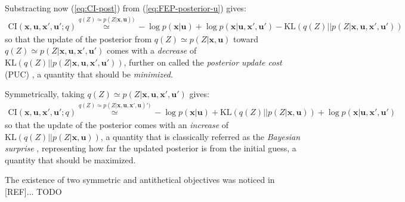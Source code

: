 \documentclass{article}
\begin{document}
{\color{magenta}
Substracting now (\ref{eq:CI-post}) from (\ref{eq:FEP-posterior-u}) gives:
\begin{align}
\text{CI}(\boldsymbol{x},\boldsymbol{u}, \boldsymbol{x}', \boldsymbol{u}';q) \stackrel{q(Z) \simeq p(Z|\boldsymbol{x}, \boldsymbol{u}))}{\simeq}  
-\log p(\boldsymbol{x}| \boldsymbol{u}) 
+ \log p(\boldsymbol{x}| \boldsymbol{u}, \boldsymbol{x}', \boldsymbol{u}') - \text{KL}(q(Z)||p(Z|\boldsymbol{x}, \boldsymbol{u}, \boldsymbol{x}', \boldsymbol{u}'))
\end{align}
so that the update of the posterior from $q(Z)\simeq p(Z|\boldsymbol{x}, \boldsymbol{u})$ toward $q(Z)\simeq p(Z|\boldsymbol{x}, \boldsymbol{u}, \boldsymbol{x}', \boldsymbol{u}')$ comes with a \emph{decrease} of $\text{KL}(q(Z)||p(Z|\boldsymbol{x}, \boldsymbol{u}, \boldsymbol{x}', \boldsymbol{u}'))$, further on called the \emph{posterior update cost} (PUC) , a quantity that should be \emph{minimized}.

Symmetrically, taking $q(Z) \simeq p(Z|\boldsymbol{x}, \boldsymbol{u},\boldsymbol{x}', \boldsymbol{u}')$ gives:
\begin{align}
 \text{CI}(\boldsymbol{x},\boldsymbol{u}, \boldsymbol{x}', \boldsymbol{u}'; q) \stackrel{q(Z) \simeq p(Z|\boldsymbol{x}, \boldsymbol{u},\boldsymbol{x}', \boldsymbol{u})')}{\simeq}  
 -\log p(\boldsymbol{x}| \boldsymbol{u}) 
 + \text{KL}(q(Z)||p(Z|\boldsymbol{x}, \boldsymbol{u}))
 + \log p(\boldsymbol{x}| \boldsymbol{u}, \boldsymbol{x}', \boldsymbol{u}') 
\end{align}
so that the update of the posterior comes with an \emph{increase} of $\text{KL}(q(Z)||p(Z|\boldsymbol{x}, \boldsymbol{u}))$, a quantity that is classically referred as the \emph{Bayesian surprise} \cite{itti2005bayesian}, representing how far the updated posterior is from the initial guess, a quantity that should be maximized.

The existence of two symmetric and antithetical objectives was noticed in [REF]... TODO



}
\end{document}
